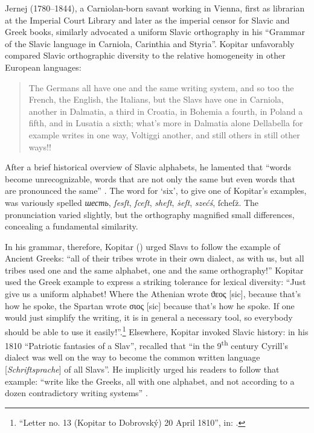 Jernej \citeauthor{kopitar_grammatik_1808} (1780--1844), a Carniolan-born savant working in Vienna, first as librarian at the Imperial Court Library and later as the imperial censor for Slavic and Greek books, similarly advocated a uniform Slavic orthography in his \citeyear{kopitar_grammatik_1808} “Grammar of the Slavic language in Carniola, Carinthia and Styria”. Kopitar unfavorably compared Slavic orthographic diversity to the relative homogeneity in other European languages:

\begin{quote}
    The Germans all have one and the same writing system, and so too the French, the English, the Italians, but the Slavs have one in Carniola, another in Dalmatia, a third in Croatia, in Bohemia a fourth, in Poland a fifth, and in Lusatia a sixth; what’s more in Dalmatia alone Dellabella for example writes in one way, Voltiggi another, and still others in still other ways!! \citep[xxv-xxvi]{kopitar_grammatik_1808}
\end{quote}

\noindent After a brief historical overview of Slavic alphabets, he lamented that “words become unrecognizable, words that are not only the same but even words that are pronounced the same” \citep[xxvi]{kopitar_grammatik_1808}. The word for ‘six’, to give one of Kopitar’s examples, was variously spelled \textit{шесть}, \textit{ſesſt}, \textit{ſceſt}, \textit{sheſt}, \textit{ṡeſt}, \textit{szećś}, {\Blackletter ſcheſż}. The pronunciation varied slightly, but the orthography magnified small differences, concealing a fundamental similarity.

In his grammar, therefore, Kopitar (\citeyear[xxi]{kopitar_grammatik_1808}) urged Slavs to follow the example of Ancient Greeks: “all of their tribes wrote in their own dialect, as with us, but all tribes used one and the same alphabet, one and the same orthography!” Kopitar used the Greek example to express a striking tolerance for lexical diversity: “Just give us a uniform alphabet! Where the Athenian wrote ϑεος [sic], because that’s how he spoke, the Spartan wrote σιος [sic] because that’s how he spoke. If one would just simplify the writing, it is in general a necessary tool, so everybody should be able to use it easily!”\citep[136--137]{jagic_pisma_1895}.\footnote{“Letter no. 13 (Kopitar to Dobrovský) 20 April 1810”, in: \citet[136--137]{jagic_pisma_1895}.} Elsewhere, Kopitar invoked Slavic history: in his 1810 “Patriotic fantasies of a Slav”, \citeauthor{kopitar_patriotische_1810} recalled that “in the 9\textsuperscript{th} century Cyrill’s dialect was well on the way to become the common written language [\textit{Schriftsprache}] of all Slavs”. He implicitly urged his readers to follow that example: “write like the Greeks, all with one alphabet, and not according to a dozen contradictory writing systems” \citep[92]{kopitar_patriotische_1810}.

